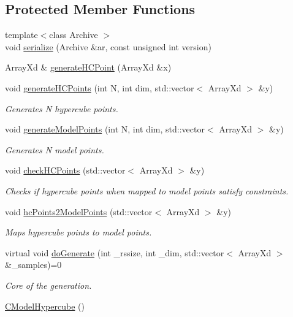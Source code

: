 \subsection*{Protected Member Functions}
\begin{DoxyCompactItemize}
\item 
{\footnotesize template$<$class Archive $>$ }\\void \hyperlink{class_go_s_u_m_1_1_c_model_hypercube_a67de6632c6f6ca3685d2a750599974c6}{serialize} (Archive \&ar, const unsigned int version)
\item 
Array\-Xd \& \hyperlink{class_go_s_u_m_1_1_c_model_hypercube_a4d64e5c09e2ed5a270ac67d44635c07c}{generate\-H\-C\-Point} (Array\-Xd \&x)
\item 
void \hyperlink{class_go_s_u_m_1_1_c_model_hypercube_ae52705f007701d127b797845f4c2ad6b}{generate\-H\-C\-Points} (int N, int dim, std\-::vector$<$ Array\-Xd $>$ \&y)
\begin{DoxyCompactList}\small\item\em Generates N hypercube points. \end{DoxyCompactList}\item 
void \hyperlink{class_go_s_u_m_1_1_c_model_hypercube_a2b5a2350b562bbb6d130e7791d5bb5e4}{generate\-Model\-Points} (int N, int dim, std\-::vector$<$ Array\-Xd $>$ \&y)
\begin{DoxyCompactList}\small\item\em Generates N model points. \end{DoxyCompactList}\item 
void \hyperlink{class_go_s_u_m_1_1_c_model_hypercube_a1419c038ee212ec1bc80420da32a7351}{check\-H\-C\-Points} (std\-::vector$<$ Array\-Xd $>$ \&y)
\begin{DoxyCompactList}\small\item\em Checks if hypercube points when mapped to model points satisfy constraints. \end{DoxyCompactList}\item 
void \hyperlink{class_go_s_u_m_1_1_c_model_hypercube_adcf1da087b48ec609994853abae9c52e}{hc\-Points2\-Model\-Points} (std\-::vector$<$ Array\-Xd $>$ \&y)
\begin{DoxyCompactList}\small\item\em Maps hypercube points to model points. \end{DoxyCompactList}\item 
virtual void \hyperlink{class_go_s_u_m_1_1_c_model_hypercube_a1e92dd784f1c20b604fecd1a48bea2f4}{do\-Generate} (int \-\_\-rssize, int \-\_\-dim, std\-::vector$<$ Array\-Xd $>$ \&\-\_\-samples)=0
\begin{DoxyCompactList}\small\item\em Core of the generation. \end{DoxyCompactList}\item 
\hyperlink{class_go_s_u_m_1_1_c_model_hypercube_a2bd3061ba2c197b831389341a0ff5661}{C\-Model\-Hypercube} ()
\end{DoxyCompactItemize}
